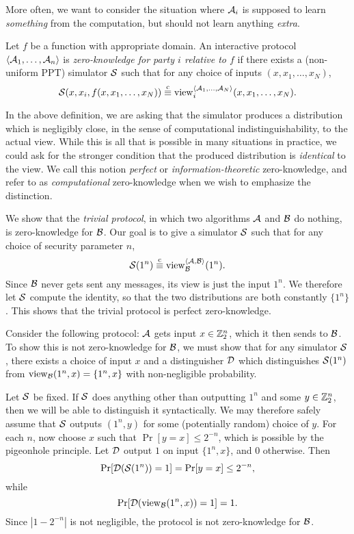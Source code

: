 More often, we want to consider the situation where $\mathcal{A}_i$ is supposed to learn
\emph{something} from the computation, but should not learn anything
\emph{extra}.

\begin{dfn}\label{def:zero-knowledge}
  Let $f$ be a function with appropriate domain. An interactive protocol
  $\langle\mathcal{A}_1, \dots, \mathcal{A}_n\rangle$ is \emph{zero-knowledge for party $i$ relative to
  $f$} if there exists a (non-uniform PPT) simulator $\mathcal{S}$ such that for any
  choice of inputs $(x, x_1, \dots, x_N)$, \[
  \mathcal{S}(x, x_i, f(x, x_1, \dots, x_N)) \overset{\text{c}}{\equiv} \operatorname{view}_i^{\langle\mathcal{A}_1, \dots, \mathcal{A}_N\rangle}(x, x_1, \dots, x_N).
\]
\end{dfn}

In the above definition, we are asking that the simulator produces a
distribution which is negligibly close, in the sense of computational
indistinguishability, to the actual view. While this is all that is possible in
many situations in practice, we could ask for the stronger condition that the
produced distribution is \emph{identical} to the view. We call this notion
\emph{perfect} or \emph{information-theoretic} zero-knowledge, and refer to
 as
\emph{computational} zero-knowledge when we wish to emphasize the distinction.

\begin{ex}\label{ex:trivial-protocol}
  We show that the \emph{trivial protocol}, in which two algorithms $\mathcal{A}$ and
  $\mathcal{B}$ do nothing, is zero-knowledge for $\mathcal{B}$. Our goal is to give a
  simulator $\mathcal{S}$ such that for any choice of security parameter $n$,
  \[
    \mathcal{S}(1^n) \overset{\text{c}}{\equiv} \operatorname{view}_{\mathcal{B}}^{\langle\mathcal{A}, \mathcal{B}\rangle}(1^n).
  \] Since $\mathcal{B}$ never gets sent any messages, its view is just the input
  $1^n$. We therefore let $\mathcal{S}$ compute the identity, so that the two
  distributions are both constantly $\{1^n\}$. This shows that the trivial
  protocol is perfect zero-knowledge.
\end{ex}

\begin{ex}\label{ex:non-zero-knowledge}
  Consider the following protocol: $\mathcal{A}$ gets input $x\in\mathbb{Z}_2^n$, which it
  then sends to $\mathcal{B}$. To show this is not zero-knowledge for $\mathcal{B}$, we must
  show that for any simulator $\mathcal{S}$, there exists a choice of input $x$ and a
  distinguisher $\mathcal{D}$ which distinguishes $\mathcal{S}(1^n)$ from $\operatorname{view}_{\mathcal{B}}(1^n, x) =
  \{1^n, x\}$ with non-negligible probability.

  Let $\mathcal{S}$ be fixed. If $\mathcal{S}$ does anything other than outputting $1^n$ and
  some $y\in\mathbb{Z}_2^n$, then we will be able to distinguish it syntactically.
  We may therefore safely assume that $\mathcal{S}$ outputs $(1^n, y)$ for some
  (potentially random) choice of $y$. For each $n$, now choose $x$ such that
  $\Pr[y = x]\leq 2^{-n}$, which is possible by the pigeonhole principle. Let
  $\mathcal{D}$ output $1$ on input $\{1^n, x\}$, and $0$ otherwise. Then \[
    \Pr[\mathcal{D}(\mathcal{S}(1^n)) = 1] = \Pr[y = x] \leq 2^{-n},
  \] while \[
    \Pr[\mathcal{D}(\operatorname{view}_{\mathcal{B}}(1^n, x)) = 1] = 1.
  \] Since $|1 - 2^{-n}|$ is not negligible, the protocol is not
  zero-knowledge for $\mathcal{B}$.
\end{ex}

